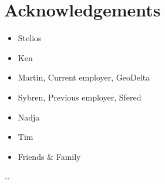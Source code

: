 
\chapter*{Acknowledgements}

\begin{itemize}
    \item Stelios
    \item Ken
    \item Martin, Current employer, GeoDelta 
    \item Sybren, Previous employer, Sfered
    \item Nadja
    \item Tim
    \item Friends \& Family
\end{itemize}

\ldots



 